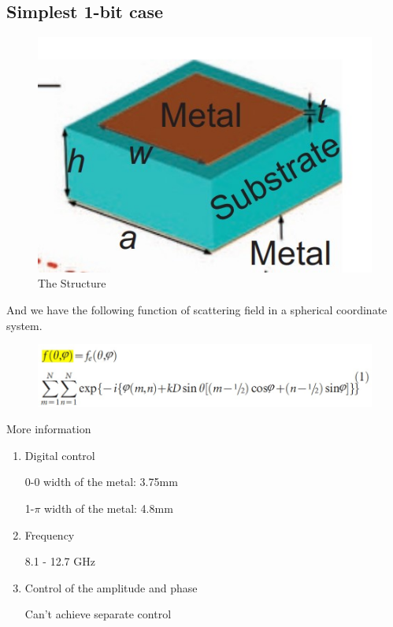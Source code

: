 \documentclass[]{article}
\begin{document}
	\subsection*{Simplest 1-bit case}
	\begin{figure}[H]
		\centering
		\includegraphics[scale=0.65]{Fig/1.jpg}
		\caption{The Structure}
	\end{figure}
	\par And we have the following function of scattering field in a spherical coordinate system.
	\begin{figure}[H]
		\centering
		\includegraphics[scale=0.65]{Fig/2.jpg}
	\end{figure}
	\par More information
	\begin{enumerate}
		\item Digital control
			\par 0-0  width of the metal: 3.75mm
			\par 1-$\pi$   width of the metal: 4.8mm
		\item Frequency 
			\par 8.1 - 12.7 GHz
		\item Control of the amplitude and phase
			\par Can't achieve separate control
	\end{enumerate}
\end{document}
